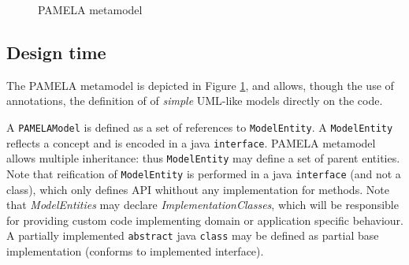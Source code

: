 \begin{center}
\begin{figure}
    \caption{PAMELA metamodel}
    \label{fig:PamelaMetaModel}
\end{figure}
\end{center}
    
\subsection{Design time}
\label{sub:DesignTime}

The PAMELA metamodel is depicted in Figure  \ref{fig:PamelaMetaModel}, and allows, though the use of annotations, the definition of of \emph{simple} UML-like models directly on the code.

A \texttt{PAMELAModel} is defined as a set of references to \texttt{ModelEntity}. A \texttt{ModelEntity} reflects a concept and is encoded in a java \texttt{interface}. PAMELA metamodel allows multiple inheritance: thus \texttt{ModelEntity} may define a set of parent entities. Note that reification of \texttt{ModelEntity} is performed in a java \texttt{interface} (and not a class), which only defines API whithout any implementation for methods. 
Note that \emph{ModelEntities} may declare \emph{ImplementationClasses}, which will be responsible for providing custom code implementing domain or application specific behaviour. A partially implemented \texttt{abstract} java \texttt{class} may be defined as partial base implementation (conforms to implemented interface).

